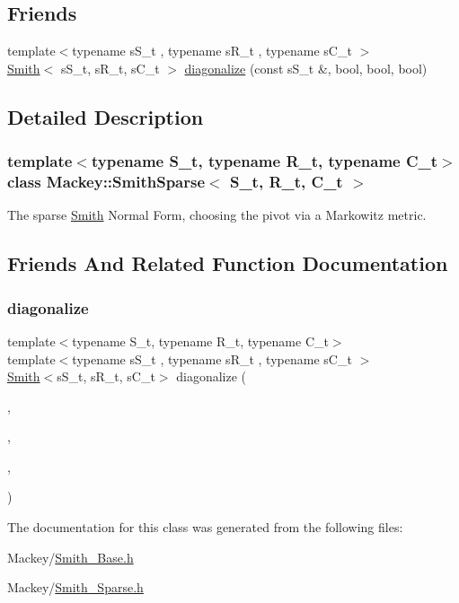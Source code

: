 \subsection*{Friends}
\begin{DoxyCompactItemize}
\item 
{\footnotesize template$<$typename s\+S\+\_\+t , typename s\+R\+\_\+t , typename s\+C\+\_\+t $>$ }\\\hyperlink{classMackey_1_1Smith}{Smith}$<$ s\+S\+\_\+t, s\+R\+\_\+t, s\+C\+\_\+t $>$ \hyperlink{classMackey_1_1SmithSparse_a020186c97759855bd063eeaaf0a17351}{diagonalize} (const s\+S\+\_\+t \&, bool, bool, bool)
\end{DoxyCompactItemize}


\subsection{Detailed Description}
\subsubsection*{template$<$typename S\+\_\+t, typename R\+\_\+t, typename C\+\_\+t$>$\newline
class Mackey\+::\+Smith\+Sparse$<$ S\+\_\+t, R\+\_\+t, C\+\_\+t $>$}

The sparse \hyperlink{classMackey_1_1Smith}{Smith} Normal Form, choosing the pivot via a Markowitz metric. 

\subsection{Friends And Related Function Documentation}
\mbox{\label{classMackey_1_1SmithSparse_a020186c97759855bd063eeaaf0a17351}} 
\subsubsection{\texorpdfstring{diagonalize}{diagonalize}}
{\footnotesize\ttfamily template$<$typename S\+\_\+t, typename R\+\_\+t, typename C\+\_\+t$>$ \\
template$<$typename s\+S\+\_\+t , typename s\+R\+\_\+t , typename s\+C\+\_\+t $>$ \\
\hyperlink{classMackey_1_1Smith}{Smith}$<$s\+S\+\_\+t, s\+R\+\_\+t, s\+C\+\_\+t$>$ diagonalize (\begin{DoxyParamCaption}\item[{const s\+S\+\_\+t \&}]{,  }\item[{bool}]{,  }\item[{bool}]{,  }\item[{bool}]{ }\end{DoxyParamCaption})\hspace{0.3cm}{\ttfamily [friend]}}



The documentation for this class was generated from the following files\+:\begin{DoxyCompactItemize}
\item 
Mackey/\hyperlink{Smith__Base_8h}{Smith\+\_\+\+Base.\+h}\item 
Mackey/\hyperlink{Smith__Sparse_8h}{Smith\+\_\+\+Sparse.\+h}\end{DoxyCompactItemize}
